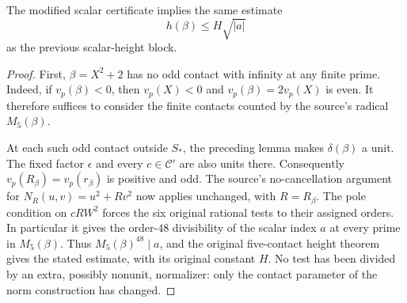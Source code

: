 \begin{lemma}
\label{lem:normalized-scalar-soundness}
The modified scalar certificate implies the same estimate
\[
                      h(\beta)\le H\sqrt{|a|}
\]
as the previous scalar-height block.
\end{lemma}
\begin{proof}
First, $\beta=X^2+2$ has no odd contact with infinity at any finite
prime.  Indeed, if $v_p(\beta)<0$, then $v_p(X)<0$ and
$v_p(\beta)=2v_p(X)$ is even.  It therefore suffices to consider
the finite contacts counted by the source's radical $M_5(\beta)$.

At each such odd contact outside $S_*$, the preceding lemma makes
$\delta(\beta)$ a unit.  The fixed factor $\epsilon$ and every
$c\in\mathcal C'$ are also units there.  Consequently
$v_p(R_\beta)=v_p(r_\beta)$ is positive and odd.  The source's
no-cancellation argument for $N_R(u,v)=u^2+Rv^2$ now applies
unchanged, with $R=R_\beta$.  The pole condition on $cRW^2$ forces
the six original rational tests to their assigned orders.  In
particular it gives the order-$48$ divisibility of the scalar index
$a$ at every prime in $M_5(\beta)$.  Thus
$M_5(\beta)^{48}\mid a$, and the original five-contact height
theorem gives the stated estimate, with its original constant $H$.
No test has been divided by an extra, possibly nonunit, normalizer:
only the contact parameter of the norm construction has changed.
\end{proof}

